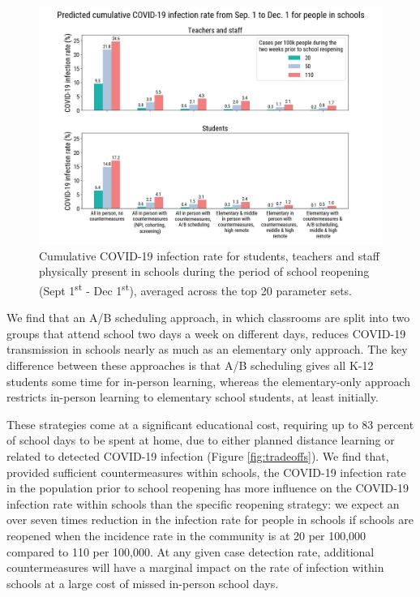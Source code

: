 \documentclass[preprint,12pt]{elsarticle}
\begin{document}
\begin{figure}[h]
    \centering
    \includegraphics[scale=0.4]{attack_rate_2020-08-06.png}
    \caption{Cumulative COVID-19 infection rate for students, teachers and staff physically present in schools during the period of school reopening (Sept 1\textsuperscript{st} - Dec 1\textsuperscript{st}), averaged across the top 20 parameter sets.}
    \label{fig:attack_rate}
\end{figure}

We find that an A/B scheduling approach, in which classrooms are split into two groups that attend school two days a week on different days, reduces COVID-19 transmission in schools nearly as much as an elementary only approach. The key difference between these approaches is that A/B scheduling gives all K-12 students some time for in-person learning, whereas the elementary-only approach restricts in-person learning to elementary school students, at least initially.

These strategies come at a significant educational cost, requiring up to 83 percent of school days to be spent at home, due to either planned distance learning or related to detected COVID-19 infection (Figure \ref{fig:tradeoffs}). We find that, provided sufficient countermeasures within schools, the COVID-19 infection rate in the population prior to school reopening has more influence on the COVID-19 infection rate within schools than the specific reopening strategy: we expect an over seven times reduction in the infection rate for people in schools if schools are reopened when the incidence rate in the community is at 20 per 100,000 compared to 110 per 100,000. At any given case detection rate, additional countermeasures will have a marginal impact on the rate of infection within schools at a large cost of missed in-person school days.
\end{document}
